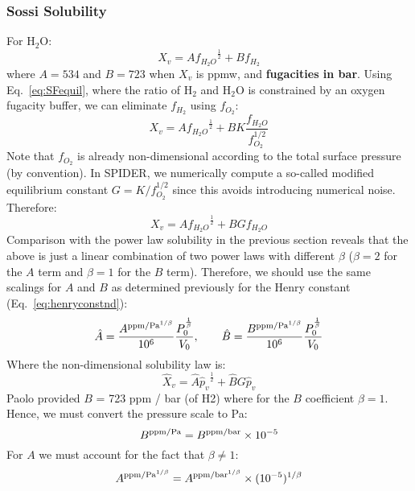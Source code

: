 \subsubsection{Sossi Solubility}
For H$_2$O:
\begin{equation}
X_v = A{f_{H_2O}}^\frac{1}{2}+B f_{H_2}
\end{equation}
where $A=534$ and $B=723$ when $X_v$ is ppmw, and \textbf{fugacities in bar}.  Using Eq.~\ref{eq:SFequil}, where the ratio of H$_2$ and H$_2$O is constrained by an oxygen fugacity buffer, we can eliminate $f_{H_2}$ using $f_{O_2}$:
\begin{equation}
X_v = A{f_{H_2O}}^\frac{1}{2}+B K \frac{f_{H_2O}}{f_{O_2}^{1/2}}
\end{equation}
Note that $f_{O_2}$ is already non-dimensional according to the total surface pressure (by convention).  In SPIDER, we numerically compute a so-called modified equilibrium constant $G=K/f_{O_2}^{1/2}$ since this avoids introducing numerical noise.  Therefore:
\begin{equation}
X_v = A{f_{H_2O}}^\frac{1}{2}+B G f_{H_2O}
\end{equation}
Comparison with the power law solubility in the previous section reveals that the above is just a linear combination of two power laws with different $\beta$ ($\beta=2$ for the $A$ term and $\beta=1$ for the $B$ term).  Therefore, we should use the same scalings for $A$ and $B$ as determined previously for the Henry constant (Eq.~\ref{eq:henryconstnd}):
\begin{equation}
\hat{A} = \frac{A^{{\rm ppm/Pa}^{1/\beta}}}{10^6} \frac{P_0^\frac{1}{\beta}}{V_0}, \qquad \hat{B} = \frac{B^{{\rm ppm/Pa}^{1/\beta}}}{10^6} \frac{P_0^\frac{1}{\beta}}{V_0}
\end{equation}
Where the non-dimensional solubility law is:
\begin{equation}
\hat{X}_v = \hat{A} {\hat{p}_v}^\frac{1}{2}+ \hat{B} G \hat{p}_v
\end{equation}
Paolo provided $B$ = 723 ppm / bar (of H2) where for the $B$ coefficient $\beta=1$.  Hence, we must convert the pressure scale to Pa:
\begin{equation}
B^{\rm ppm/Pa} = B^{\rm ppm/bar} \times 10^{-5} 
\end{equation}
For $A$ we must account for the fact that $\beta \neq 1$:
\begin{equation}
A^{{\rm ppm/Pa}^{1/\beta}} = A^{{\rm ppm/bar}^{1/\beta}} \times (10^{-5})^{1/\beta}
\end{equation}
